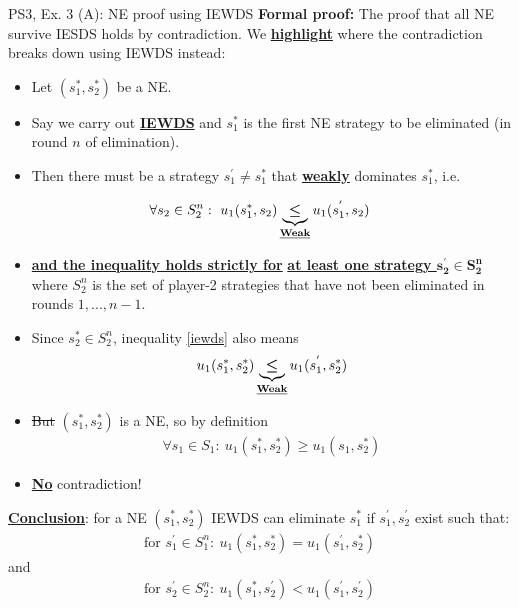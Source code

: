 \begin{frame}{PS3, Ex. 3 (A): NE proof using IEWDS}
    \textbf{Formal proof:} The proof that all NE survive IESDS holds by contradiction. We \underline{\textbf{highlight}} where the contradiction breaks down using IEWDS instead:
  \begin{multicols}{2}
    \begin{itemize}
      \item Let $(s_1^{*},s_2^{*})$ be a NE.
      \item Say we carry out \underline{\textbf{IEWDS}} and $s_1^{*}$ is the first NE strategy to be eliminated (in round $n$ of elimination).
      \item Then there must be a strategy $s_1^{'}\neq s_1^{*}$ that \underline{\textbf{weakly}} dominates $s_1^{*}$, i.e.
    \end{itemize}
      \begin{align}
        \forall s_2\in S_2^n:\ u_1(s_1^{*},s_2)\underbrace{\bm{\leq}}_\text{\underline{\textbf{Weak}}}u_1(s_1^{'},s_2)\label{iewds}
      \end{align}
      \begin{itemize}
        \item[] \underline{\textbf{and the inequality holds strictly for}} \underline{\textbf{at least one strategy $\bm{s_2^{'}\in S_2^n}$}} where $S_2^n$ is the set of player-2 strategies that have not been eliminated in rounds $1,...,n-1$.
      \end{itemize}
  \vfill\null\columnbreak
    \begin{itemize}
      \item Since $s_2^{*}\in S_2^n$, inequality \eqref{iewds} also means
      \begin{align*}
        u_1(s_1^{*},s_2^{*})\underbrace{\bm{\leq}}_\text{\underline{\textbf{Weak}}}u_1(s_1^{'},s_2^{*})
      \end{align*}
      \item \sout{But} $(s_1^{*},s_2^{*})$ is a NE, so by definition
      \begin{align*}
        \forall s_1\in S_1:\ u_1(s_1^{*},s_2^{*})\geq u_1(s_1,s_2^{*})
      \end{align*}
      \item \underline{\textbf{No}} contradiction!
    \end{itemize}
    \underline{\textbf{Conclusion}}: for a NE $(s_1^{*},s_2^{*})$ IEWDS can eliminate $s_1^{*}$ if $s_1^{'},s_2^{'}$ exist such that:
    \begin{align*}
      \text{for }s_1^{'}\in S_1^n:\ u_1(s_1^{*},s_2^{*})=u_1(s_1^{'},s_2^{*})
    \end{align*}
    and
    \begin{align*}
      \text{for }s_2^{'}\in S_2^n:\ u_1(s_1^{*},s_2^{'})<u_1(s_1^{'},s_2^{'})
    \end{align*}
  \vfill\null
  \end{multicols}
\end{frame}


